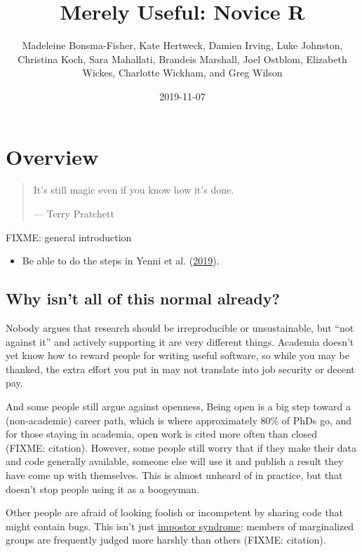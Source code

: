 \documentclass[]{Nemilov}
\title{Merely Useful: Novice R}
\author{Madeleine Bonsma-Fisher, Kate Hertweck, Damien Irving, Luke Johnston, Christina Koch, Sara Mahallati, Brandeis Marshall, Joel Ostblom, Elizabeth Wickes, Charlotte Wickham, and Greg Wilson}
\date{2019-11-07}
\providecommand{\tightlist}{%
  \setlength{\itemsep}{0pt}\setlength{\parskip}{0pt}}
\begin{document}
\maketitle

{
\setcounter{tocdepth}{1}
\tableofcontents
}
\listoftables
\listoffigures
\hypertarget{overview}{%
\chapter{Overview}\label{overview}}

\begin{quote}
It's still magic even if you know how it's done.

--- Terry Pratchett
\end{quote}

FIXME: general introduction

\begin{itemize}
\tightlist
\item
  Be able to do the steps in Yenni et al. (\protect\hyperlink{ref-Yenn2019}{2019}).
\end{itemize}

\hypertarget{overview-against}{%
\section{Why isn't all of this normal already?}\label{overview-against}}

Nobody argues that research should be irreproducible or unsustainable,
but ``not against it'' and actively supporting it are very different things.
Academia doesn't yet know how to reward people for writing useful software,
so while you may be thanked,
the extra effort you put in may not translate into job security or decent pay.

And some people still argue against openness,
Being open is a big step toward a (non-academic) career path,
which is where approximately 80\% of PhDs go,
and for those staying in academia,
open work is cited more often than closed (FIXME: citation).
However,
some people still worry that if they make their data and code generally available,
someone else will use it and publish a result they have come up with themselves.
This is almost unheard of in practice,
but that doesn't stop people using it as a boogeyman.

Other people are afraid of looking foolish or incompetent by sharing code that might contain bugs.
This isn't just \href{glossary.html\#impostor-syndrome}{impostor syndrome}:
members of marginalized groups are frequently judged more harshly than others (FIXME: citation).
\end{document}
